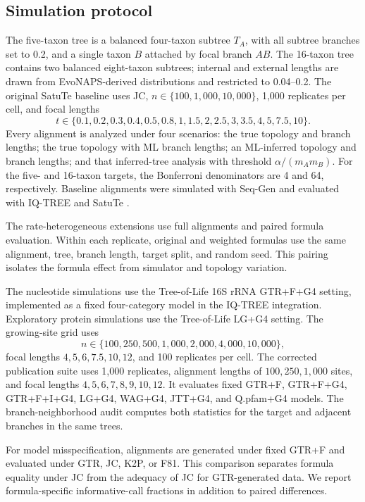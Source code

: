 \subsection*{Simulation protocol}

The five-taxon tree is a balanced four-taxon subtree \(T_A\), with all subtree branches set to 0.2, and a single taxon \(B\) attached by focal branch \(AB\). The 16-taxon tree contains two balanced eight-taxon subtrees; internal and external lengths are drawn from EvoNAPS-derived distributions and restricted to 0.04--0.2. The original SatuTe baseline uses JC, \(n\in\{100,1{,}000,10{,}000\}\), 1,000 replicates per cell, and focal lengths
\[
t\in\{0.1,0.2,0.3,0.4,0.5,0.8,1,1.5,2,2.5,3,3.5,4,5,7.5,10\}.
\]
Every alignment is analyzed under four scenarios: the true topology and branch lengths; the true topology with ML branch lengths; an ML-inferred topology and branch lengths; and that inferred-tree analysis with threshold \(\alpha/(m_A m_B)\). For the five- and 16-taxon targets, the Bonferroni denominators are 4 and 64, respectively. Baseline alignments were simulated with Seq-Gen and evaluated with IQ-TREE and SatuTe \cite{rambaut1997,minh2020iqtree}.

The rate-heterogeneous extensions use full alignments and paired formula evaluation. Within each replicate, original and weighted formulas use the same alignment, tree, branch length, target split, and random seed. This pairing isolates the formula effect from simulator and topology variation.

The nucleotide simulations use the Tree-of-Life 16S rRNA GTR+F+G4 setting, implemented as a fixed four-category model in the IQ-TREE integration. Exploratory protein simulations use the Tree-of-Life LG+G4 setting. The growing-site grid uses
\[
n\in\{100,250,500,1{,}000,2{,}000,4{,}000,10{,}000\},
\]
focal lengths \(4,5,6,7.5,10,12\), and 100 replicates per cell. The corrected publication suite uses 1,000 replicates, alignment lengths of \(100,250,1{,}000\) sites, and focal lengths \(4,5,6,7,8,9,10,12\). It evaluates fixed GTR+F, GTR+F+G4, GTR+F+I+G4, LG+G4, WAG+G4, JTT+G4, and Q.pfam+G4 models. The branch-neighborhood audit computes both statistics for the target and adjacent branches in the same trees.

For model misspecification, alignments are generated under fixed GTR+F and evaluated under GTR, JC, K2P, or F81. This comparison separates formula equality under JC from the adequacy of JC for GTR-generated data. We report formula-specific informative-call fractions in addition to paired differences.

